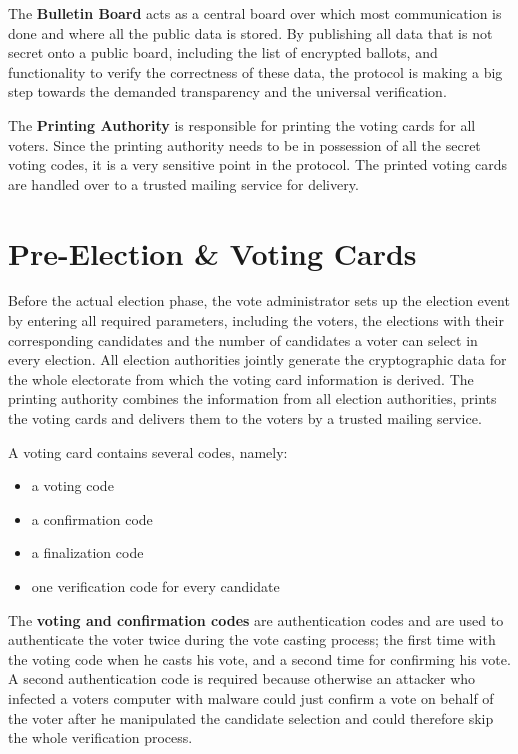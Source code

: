 The \textbf{Bulletin Board} acts as a central board over which most communication is done and where all the public data is stored. By publishing all data that is not secret onto a public board, including the list of encrypted ballots, and functionality to verify the correctness of these data, the protocol is making a big step towards the demanded transparency and the universal verification.

The \textbf{Printing Authority} is responsible for printing the voting cards for all voters. Since the printing authority needs to be in possession of all the secret voting codes, it is a very sensitive point in the protocol. The printed voting cards are handled over to a trusted mailing service for delivery.

\section{Pre-Election \& Voting Cards}
Before the actual election phase, the vote administrator sets up the election event by entering all required parameters, including the voters, the elections with their corresponding candidates and the number of candidates a voter can select in every election. All election authorities jointly generate the cryptographic data for the whole electorate from which the voting card information is derived. The printing authority combines the information from all election authorities, prints the voting cards and delivers them to the voters by a trusted mailing service. 

A voting card contains several codes, namely:

\begin{itemize}
	\item a voting code
	\item a confirmation code
	\item a finalization code
	\item one verification code for every candidate
\end{itemize}

The \textbf{voting and confirmation codes} are authentication codes and are used to authenticate the voter twice during the vote casting process; the first time with the voting code when he casts his vote, and a second time for confirming his vote. A second authentication code is required because otherwise an attacker who infected a voters computer with malware could just confirm a vote on behalf of the voter after he manipulated the candidate selection and could therefore skip the whole verification process.

